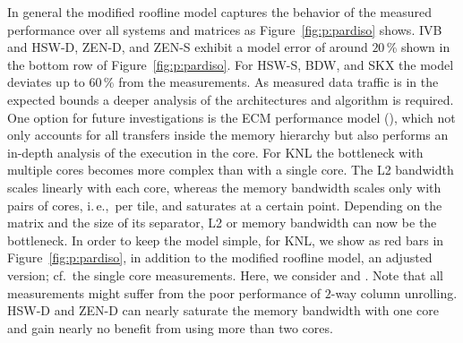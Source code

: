 In general the modified roofline model captures the behavior of the measured
performance over all systems and matrices as Figure~\ref{fig:p:pardiso} shows.
%
%
IVB and HSW-D, ZEN-D, and ZEN-S exhibit a model error of around $20$\,\% shown
in the bottom row of Figure~\ref{fig:p:pardiso}. 
For HSW-S, BDW, and SKX the model deviates up to $60$\,\% from the measurements.
%
%
As measured data traffic is in the expected bounds a deeper analysis of the
architectures and algorithm is required.
One option for future investigations is the ECM performance
model (\cite{hager-2012-ecm}), which not only accounts for all transfers inside
the memory hierarchy but also performs an in-depth analysis of the execution in
the core.
%
%
For KNL the bottleneck with multiple cores becomes more complex than with a
single core.
The L2 bandwidth scales linearly with each core, whereas the memory bandwidth
scales only with pairs of cores, i.\,e.,\ per tile, and saturates at a certain
point.
Depending on the matrix and the size of its separator, L2 or memory bandwidth can
now be the bottleneck.
%
In order to keep the model simple, for KNL, we show
as red bars in Figure~\ref{fig:p:pardiso},
in addition
to the modified
roofline model, 
an adjusted version; cf.\ the single core measurements.
Here, we consider  and .
Note that all measurements might suffer from the poor performance of $2$-way
column unrolling.
%
% 
HSW-D and ZEN-D can nearly saturate the memory bandwidth with one core and gain
nearly no benefit from using more than two cores.

